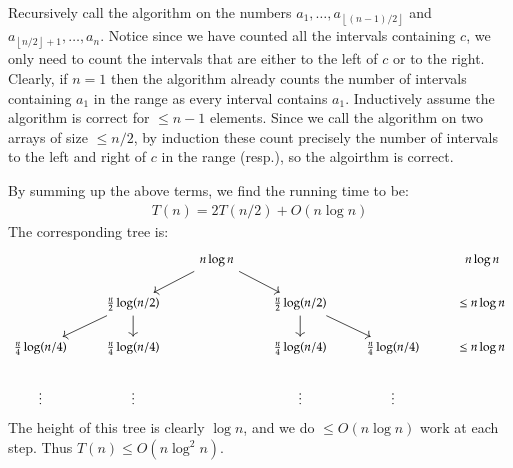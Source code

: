 \documentclass[12pt]{article}
\theoremstyle{definitionstyle}
\newcommand{\floor}[1]{\left\lfloor#1\right\rfloor}
\begin{document}
    Recursively call the algorithm on the numbers $a_1, \ldots, a_{\floor{(n-1)/2}}$ and $a_{\floor{n/2} + 1}, \ldots, a_n$. Notice since we have counted all the intervals containing $c$, we only need to count the intervals that are either to the left of $c$ or to the right. Clearly, if $n = 1$ then the algorithm already counts the number of intervals containing $a_1$ in the range as every interval contains $a_1$. Inductively assume the algorithm is correct for $\leq n-1$ elements. Since we call the algorithm on two arrays of size $\leq n/2$, by induction these count precisely the number of intervals to the left and right of $c$ in the range (resp.), so the algoirthm is correct.
    
    By summing up the above terms, we find the running time to be:
    \begin{align*}
        T(n) = 2T(n/2) + O(n\log n)
    \end{align*}
    The corresponding tree is:
    \[\begin{tikzcd}
        && {n\log n} &&& {n\log n} \\
        & {\frac{n}{2}\log(n/2)} && {\frac{n}{2}\log(n/2)} && {\leq n\log n} \\
        {\frac{n}4\log(n/4)} & {\frac{n}4\log(n/4)} && {\frac{n}4\log(n/4)} & {\frac{n}4\log(n/4)} & {\leq n\log n} \\
        \vdots & \vdots && \vdots & \vdots
        \arrow[from=1-3, to=2-2]
        \arrow[from=1-3, to=2-4]
        \arrow[from=2-2, to=3-1]
        \arrow[from=2-2, to=3-2]
        \arrow[from=2-4, to=3-4]
        \arrow[from=2-4, to=3-5]
    \end{tikzcd}\]
    The height of this tree is clearly $\log n$, and we do $\leq O(n\log n)$ work at each step. Thus $T(n) \leq O(n\log^2n)$.
    
\end{document}
